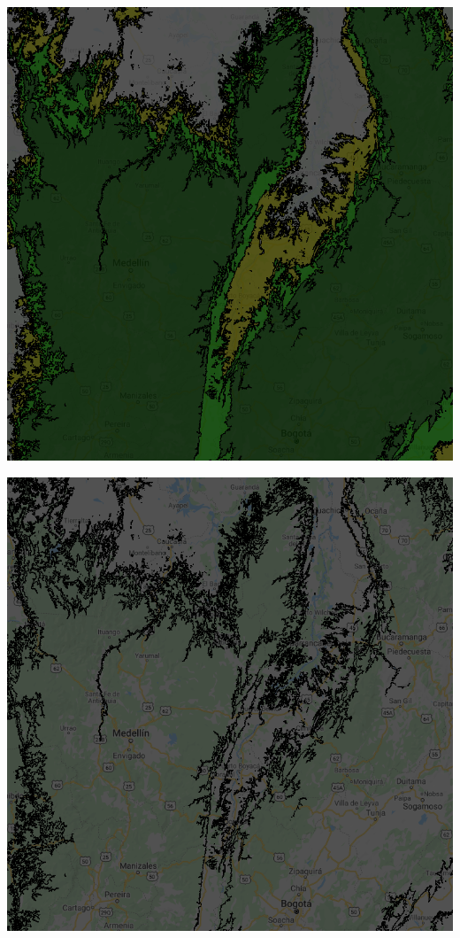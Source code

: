 \documentclass[
  letterpaper,
  DIV=11,
  numbers=noendperiod]{scrreprt}
\begin{document}
\includegraphics{./F5/image36.png}

\includegraphics{./F5/image7.png}
\end{document}
